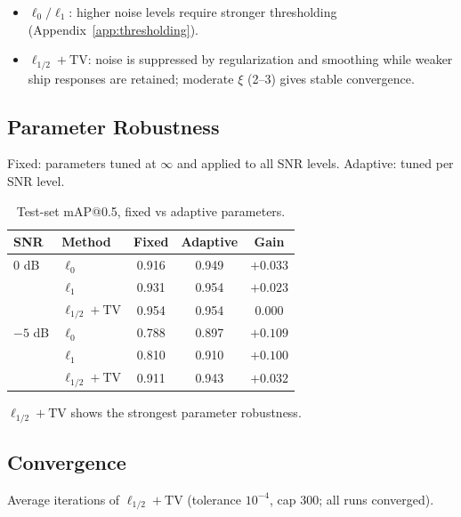 \documentclass[11pt,a4paper]{article}
\theoremstyle{definition}
\begin{document}
\begin{itemize}
  \item $\ell_0/\ell_1$: higher noise levels require stronger thresholding (Appendix~\ref{app:thresholding}).
  \item $\ell_{1/2}+\mathrm{TV}$: noise is suppressed by regularization and smoothing while weaker ship
        responses are retained; moderate $\xi$ (2--3) gives stable convergence.
\end{itemize}

\subsection{Parameter Robustness}

Fixed: parameters tuned at $\infty$ and applied to all SNR levels. Adaptive: tuned per SNR level.

\begin{table}[H]
\centering
\caption{Test-set mAP@0.5, fixed vs adaptive parameters.}\label{tab:robust}
\begin{tabular}{|l|l|c|c|c|}
\hline
SNR & Method & Fixed & Adaptive & Gain \\
\hline
0 dB & $\ell_0$ & 0.916 & 0.949 & $+0.033$ \\
\hline
 & $\ell_1$ & 0.931 & 0.954 & $+0.023$ \\
\hline
 & $\ell_{1/2}+\mathrm{TV}$ & 0.954 & 0.954 & 0.000 \\
\hline
$-5$ dB & $\ell_0$ & 0.788 & 0.897 & $+0.109$ \\
\hline
 & $\ell_1$ & 0.810 & 0.910 & $+0.100$ \\
\hline
 & $\ell_{1/2}+\mathrm{TV}$ & 0.911 & 0.943 & $+0.032$ \\
\hline
\end{tabular}
\end{table}

$\ell_{1/2}+\mathrm{TV}$ shows the strongest parameter robustness.

\subsection{Convergence}

Average iterations of $\ell_{1/2}+\mathrm{TV}$ (tolerance $10^{-4}$, cap 300; all runs converged).
\end{document}
